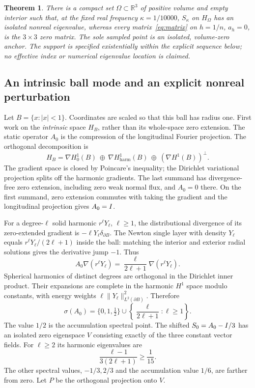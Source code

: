 \documentclass[11pt]{article}
\newtheorem{theorem}{Theorem}
\theoremstyle{remark}\newtheorem{remark}[theorem]{Remark}
\newcommand{\R}{\mathbb R}\newcommand{\C}{\mathbb C}\newcommand{\Z}{\mathbb Z}
\begin{document}
\begin{theorem}\label{thm:negative}
There is a compact set $\Omega\subset\R^3$ of positive volume and empty interior such that, at the fixed real frequency $\kappa=1/10000$, $S_\kappa$ on $H_\Omega$ has an isolated nonreal eigenvalue, whereas every matrix~\eqref{eq:matrix} on $h=1/n$, $a_h=0$, is the $3\times3$ zero matrix. The sole sampled point is an isolated, volume-zero anchor. The support is specified existentially within the explicit sequence below; no effective index or numerical eigenvalue location is claimed.
\end{theorem}

\subsection{An intrinsic ball mode and an explicit nonreal perturbation}

Let $B=\{x:|x|<1\}$. Coordinates are scaled so that this ball has radius one. First work on the \emph{intrinsic} space $H_B$, rather than its whole-space zero extension. The static operator $A_0$ is the compression of the longitudinal Fourier projection. The orthogonal decomposition is
\begin{equation}\label{eq:hodge}
 H_B=\nabla H_0^1(B)\ \oplus\ \nabla H_{\mathrm{harm}}^1(B)
                  \ \oplus\ (\nabla H^1(B))^\perp.
\end{equation}
The gradient space is closed by Poincare's inequality; the Dirichlet variational projection splits off the harmonic gradients. The last summand has divergence-free zero extension, including zero weak normal flux, and $A_0=0$ there. On the first summand, zero extension commutes with taking the gradient and the longitudinal projection gives $A_0=I$.

For a degree-$\ell$ solid harmonic $r^\ell Y_\ell$, $\ell\ge1$, the distributional divergence of its zero-extended gradient is $-\ell Y_\ell\delta_{\partial B}$. The Newton single layer with density $Y_\ell$ equals $r^\ell Y_\ell/(2\ell+1)$ inside the ball: matching the interior and exterior radial solutions gives the derivative jump $-1$. Thus
\[
 A_0\nabla(r^\ell Y_\ell)=\frac{\ell}{2\ell+1}\nabla(r^\ell Y_\ell).
\]
Spherical harmonics of distinct degrees are orthogonal in the Dirichlet inner product. Their expansions are complete in the harmonic $H^1$ space modulo constants, with energy weights $\ell\|Y_\ell\|_{L^2(\partial B)}^2$. Therefore
\begin{equation}\label{eq:ballspectrum}
 \sigma(A_0)=\{0,1,\tfrac12\}\cup
             \left\{\frac{\ell}{2\ell+1}:\ell\ge1\right\}.
\end{equation}
The value $1/2$ is the accumulation spectral point. The shifted $S_0=A_0-I/3$ has an isolated zero eigenspace $V$ consisting exactly of the three constant vector fields. For $\ell\ge2$ its harmonic eigenvalues are
\[
 \frac{\ell-1}{3(2\ell+1)}\ge\frac1{15}.
\]
The other spectral values, $-1/3,2/3$ and the accumulation value $1/6$, are farther from zero. Let $P$ be the orthogonal projection onto $V$.
\end{document}
